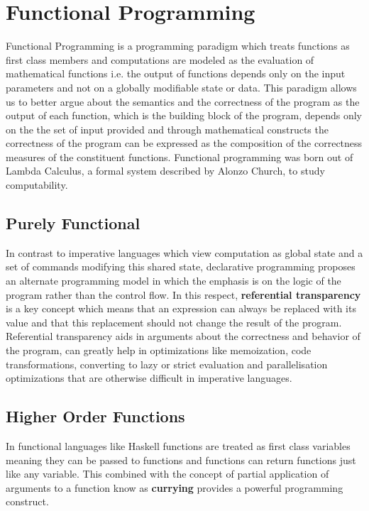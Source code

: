 \chapter{Functional Programming}
\label{chap:FuncProg}

Functional Programming is a programming paradigm which treats functions as first class members
and computations are modeled as the evaluation of mathematical functions i.e. the output of functions
depends only on the input parameters and not on a globally modifiable state or data.
This paradigm allows us to better argue about the semantics and the correctness of the program as the output of each function,
which is the building block of the program, depends only on the the set of input provided and through
mathematical constructs the correctness of the program can be expressed as the composition of the correctness measures
of the constituent functions.
Functional programming was born out of Lambda Calculus, a formal system described by Alonzo Church, to study computability.

\section{Purely Functional}
In contrast to imperative languages which view computation as global state and a set of commands modifying this shared state,
declarative programming proposes an alternate programming model in which the emphasis is on the logic of the program rather
than the control flow.
In this respect, \textbf{referential transparency} is a key concept which means that an expression can always be replaced with its
value and that this replacement should not change the result of the program.
Referential transparency aids in arguments about the correctness and behavior of the program, can greatly help in optimizations
like memoization, code transformations, converting to lazy or strict evaluation and parallelisation optimizations that are
otherwise difficult in imperative languages.

\section{Higher Order Functions}
In functional languages like Haskell functions are treated as first class variables meaning they can be passed to functions
and functions can return functions just like any variable. This combined with the concept of partial application of arguments to a
function know as \textbf{currying} provides a powerful programming construct.

